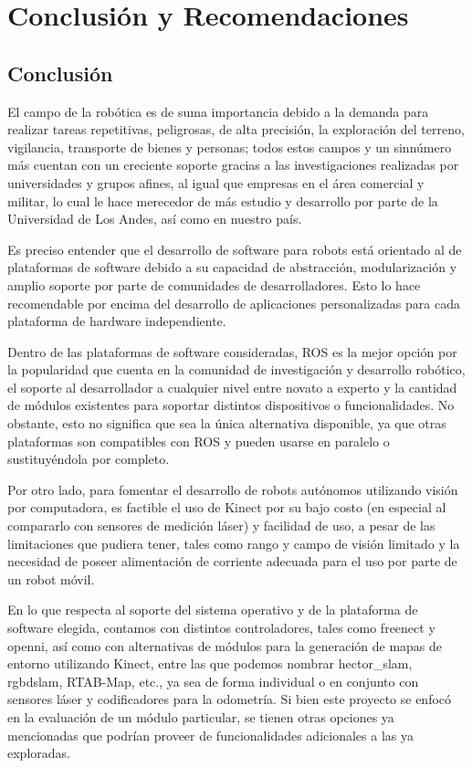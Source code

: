 \chapter{Conclusión y Recomendaciones}

\section{Conclusión}

El campo de la robótica es de suma importancia debido a la demanda para realizar tareas repetitivas, peligrosas, de alta precisión, la exploración del terreno, vigilancia, transporte de bienes y personas; todos estos campos y un sinnúmero más cuentan con un creciente soporte gracias a las investigaciones realizadas por universidades y grupos afines, al igual que empresas en el área comercial y militar, lo cual le hace merecedor de más estudio y desarrollo por parte de la Universidad de Los Andes, así como en nuestro país.

Es preciso entender que el desarrollo de software para robots está orientado al de plataformas de software debido a su capacidad de abstracción, modularización y amplio soporte por parte de comunidades de desarrolladores. Esto lo hace recomendable por encima del desarrollo de aplicaciones personalizadas para cada plataforma de hardware independiente.

Dentro de las plataformas de software consideradas, ROS es la mejor opción por la popularidad que cuenta en la comunidad de investigación y desarrollo robótico, el soporte al desarrollador a cualquier nivel entre novato a experto y la cantidad de módulos existentes para soportar distintos dispositivos o funcionalidades. No obstante, esto no significa que sea la única alternativa disponible, ya que otras plataformas son compatibles con ROS y pueden usarse en paralelo o sustituyéndola por completo.

Por otro lado, para fomentar el desarrollo de robots autónomos utilizando visión por computadora, es factible el uso de Kinect por su bajo costo (en especial al compararlo con sensores de medición láser) y facilidad de uso, a pesar de las limitaciones que pudiera tener, tales como rango y campo de visión limitado y la necesidad de poseer alimentación de corriente adecuada para el uso por parte de un robot móvil.

En lo que respecta al soporte del sistema operativo y de la plataforma de software elegida, contamos con distintos controladores, tales como freenect y openni, así como con alternativas de módulos para la generación de mapas de entorno utilizando Kinect, entre las que podemos nombrar hector\_slam, rgbdslam, RTAB-Map, etc., ya sea de forma individual o en conjunto con sensores láser y codificadores para la odometría. Si bien este proyecto se enfocó en la evaluación de un módulo particular, se tienen otras opciones ya mencionadas que podrían proveer de funcionalidades adicionales a las ya exploradas.


